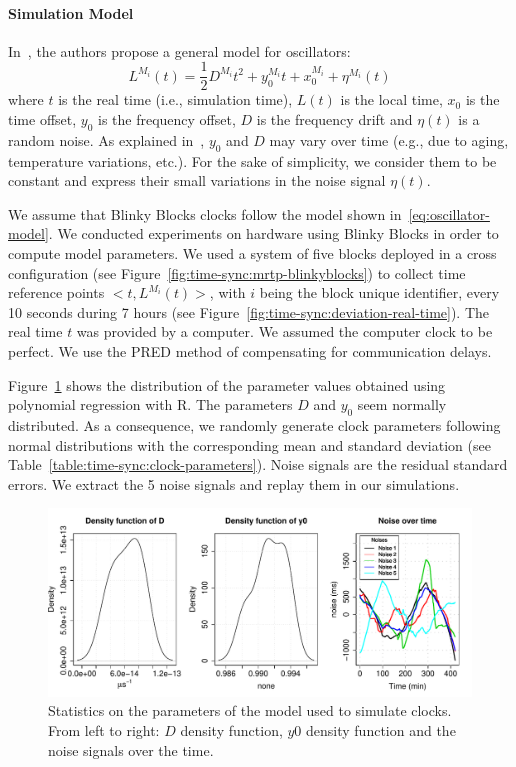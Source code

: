 \paragraph{Simulation Model}

In~\cite{allan1987time}, the authors propose a general model for oscillators:
\begin{equation}
L^{M_i}(t) = \frac{1}{2}D^{M_i}t^2 + y^{M_i}_0t + x_0^{M_i} + \eta^{M_i}(t)
\label{eq:oscillator-model}
\end{equation}
where $t$ is the real time (i.e., simulation time), $L(t)$ is the local time, $x_0$ is the time offset, $y_0$ is the frequency offset, $D$ is the frequency drift and $\eta(t)$ is a random noise. As explained in~\cite{allan1987time}, $y_0$ and $D$ may vary over time (e.g., due to aging, temperature variations, etc.). For the sake of simplicity, we consider them to be constant and express their small variations in the noise signal $\eta(t)$.

We assume that Blinky Blocks clocks follow the model shown in~\eqref{eq:oscillator-model}. We conducted experiments on hardware using Blinky Blocks in order to compute model parameters. We used a system of five blocks deployed in a cross configuration (see Figure~\ref{fig:time-sync:mrtp-blinkyblocks}) to collect time reference points $<t,L^{M_i}(t)>$, with $i$ being the block unique identifier, every 10 seconds during 7 hours (see Figure~\ref{fig:time-sync:deviation-real-time}). The real time $t$ was provided by a computer. We assumed the computer clock to be perfect. We use the PRED method of compensating for communication delays.

Figure~\ref{fig:time-sync:clock-parameters} shows the distribution of the parameter values obtained using polynomial regression with R. The parameters $D$ and $y_0$ seem normally distributed. As a consequence, we randomly generate clock parameters following normal distributions with the corresponding mean and standard deviation (see Table~\ref{table:time-sync:clock-parameters}). Noise signals are the residual standard errors. We extract the 5 noise signals and replay them in our simulations.

\begin{figure}[h!]
	\centering
	\includegraphics[width=\textwidth]{images/time-synchronization/parameters.pdf}
	\caption{Statistics on the parameters of the model used to simulate clocks. From left to right: $D$ density function, $y0$ density function and the noise signals over the time.}
	\label{fig:time-sync:clock-parameters}
\end{figure}

